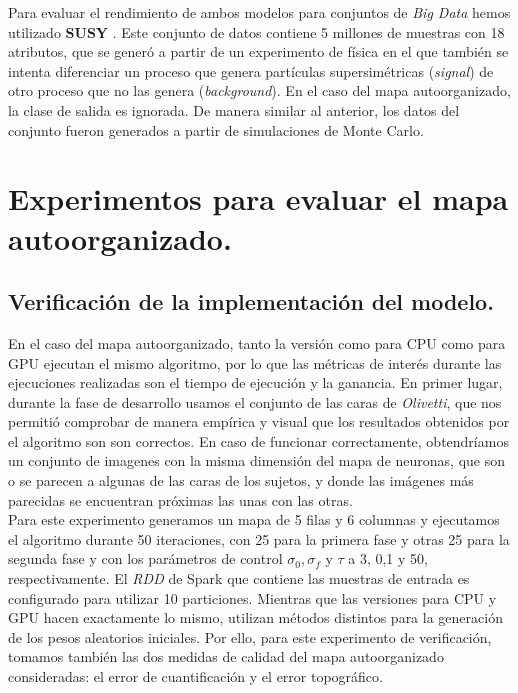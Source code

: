 Para evaluar el rendimiento de ambos modelos para conjuntos de \textit{Big Data} hemos utilizado \textbf{SUSY} \cite{susy}. Este conjunto de datos contiene 5 millones de muestras con 18 atributos, que se generó a partir de un experimento de física en el que también se intenta diferenciar un proceso que genera partículas supersimétricas (\textit{signal}) de otro proceso que no las genera (\textit{background}). En el caso del mapa autoorganizado, la clase de salida es ignorada. De manera similar al anterior, los datos del conjunto fueron generados a partir de simulaciones de Monte Carlo.


\section{Experimentos para evaluar el mapa autoorganizado.}
\subsection{Verificación de la implementación del modelo.}
En el caso del mapa autoorganizado, tanto la versión como para CPU como para GPU ejecutan el mismo algoritmo, por lo que las métricas de interés durante las ejecuciones realizadas son el tiempo de ejecución y la ganancia. En primer lugar, durante la fase de desarrollo usamos el conjunto de las caras de \textit{Olivetti}, que nos permitió comprobar de manera empírica y visual que los resultados obtenidos por el algoritmo son son correctos. En caso de funcionar correctamente, obtendríamos un conjunto de imagenes con la misma dimensión del mapa de neuronas, que son o se parecen a algunas de las caras de los sujetos, y donde las imágenes más parecidas se encuentran próximas las unas con las otras. \\

Para este experimento generamos un mapa de 5 filas y 6 columnas y ejecutamos el algoritmo durante 50 iteraciones, con 25 para la primera fase y otras 25 para la segunda fase y con los parámetros de control $\sigma_0, \sigma_f$ y $\tau$ a 3, 0,1 y 50, respectivamente. El \textit{RDD} de Spark que contiene las muestras de entrada es configurado para utilizar 10 particiones. Mientras que las versiones para CPU y GPU hacen exactamente lo mismo, utilizan métodos distintos para la generación de los pesos aleatorios iniciales. Por ello, para este experimento de verificación, tomamos también las dos medidas de calidad del mapa autoorganizado consideradas: el error de cuantificación y el error topográfico.\\

